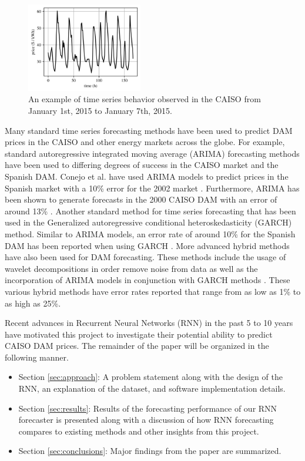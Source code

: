 \documentclass[sigconf]{acmart}
\begin{document}
\begin{figure}[h]
\includegraphics[width=0.45\textwidth]{fig_1.png}
\caption{An example of time series behavior observed in the CAISO from January 1st, 2015 to January 7th, 2015.}
\label{fig:ex_prices}
\end{figure}

Many standard time series forecasting methods have been used to predict DAM prices in the CAISO and other energy markets across the globe. For example, standard autoregressive integrated moving average (ARIMA) forecasting methods have been used to differing degrees of success in the CAISO market and the Spanish DAM. Conejo et al. have used ARIMA models to predict prices in the Spanish market with a 10\% error for the 2002 market \cite{Conejo2005a}. Furthermore, ARIMA has been shown to generate forecasts in the 2000 CAISO DAM with an error of around 13\% \cite{Garcia2005}. Another standard method for time series forecasting that has been used in the  Generalized autoregressive conditional heteroskedasticity (GARCH) method. Similar to ARIMA models, an error rate of around 10\% for the Spanish DAM has been reported when using GARCH \cite{Garcia2005}. More advanced hybrid methods have also been used for DAM forecasting. These methods include the usage of wavelet decompositions in order remove noise from data as well as the incorporation of ARIMA models in conjunction with GARCH methods \cite{Conejo2005,Tan2010,Amjady2008,Wang2012}. These various hybrid methods have error rates reported that range from as low as 1\% to as high as 25\%. 

Recent advances in Recurrent Neural Networks (RNN) in the past 5 to 10 years have motivated this project to investigate their potential ability to predict CAISO DAM prices. The remainder of the paper will be organized in the following manner.

\begin{itemize}
	\item Section \ref{sec:approach}: A problem statement along with the design of the RNN, an explanation of the dataset, and software implementation details.
	\item Section \ref{sec:results}: Results of the forecasting performance of our RNN forecaster is presented along with a discussion of how RNN forecasting compares to existing methods and other insights from this project.
	\item Section \ref{sec:conclusions}: Major findings from the paper are summarized.
\end{itemize}
\end{document}
